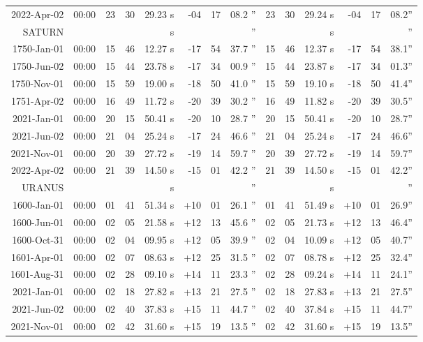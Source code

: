 \begin{longtable}{r@{\,}r|r@{h\,}r@{m\,}r<{s}|r@{°\,}r@{'\,}r<{''}||r@{h\,}r@{m\,}r<{s}|r@{°\,}r@{'\,}r<{''}}
 2022-Apr-02 & 00:00  &   23 & 30 & 29.23 & -04 & 17 & 08.2 & 23&30&29.24 & -04&17&08.2\\ %
SATURN           \\
 1750-Jan-01 & 00:00  &   15 & 46 & 12.27 & -17 & 54 & 37.7 & 15&46&12.37 & -17&54&38.1\\ %
 1750-Jun-02 & 00:00  &   15 & 44 & 23.78 & -17 & 34 & 00.9 & 15&44&23.87 & -17&34&01.3\\ %
 1750-Nov-01 & 00:00  &   15 & 59 & 19.00 & -18 & 50 & 41.0 & 15&59&19.10 & -18&50&41.4\\ %
 1751-Apr-02 & 00:00  &   16 & 49 & 11.72 & -20 & 39 & 30.2 & 16&49&11.82 & -20&39&30.5\\ %
 2021-Jan-01 & 00:00  &   20 & 15 & 50.41 & -20 & 10 & 28.7 & 20&15&50.41 & -20&10&28.7\\ %
 2021-Jun-02 & 00:00  &   21 & 04 & 25.24 & -17 & 24 & 46.6 & 21&04&25.24 & -17&24&46.6\\ %
 2021-Nov-01 & 00:00  &   20 & 39 & 27.72 & -19 & 14 & 59.7 & 20&39&27.72 & -19&14&59.7\\ %
 2022-Apr-02 & 00:00  &   21 & 39 & 14.50 & -15 & 01 & 42.2 & 21&39&14.50 & -15&01&42.2\\ %
URANUS      \\
 1600-Jan-01 & 00:00  &   01 & 41 & 51.34 & +10 & 01 & 26.1 & 01&41&51.49 & +10&01&26.9\\ %
 1600-Jun-01 & 00:00  &   02 & 05 & 21.58 & +12 & 13 & 45.6 & 02&05&21.73 & +12&13&46.4\\ %
 1600-Oct-31 & 00:00  &   02 & 04 & 09.95 & +12 & 05 & 39.9 & 02&04&10.09 & +12&05&40.7\\ %
 1601-Apr-01 & 00:00  &   02 & 07 & 08.63 & +12 & 25 & 31.5 & 02&07&08.78 & +12&25&32.4\\ %
 1601-Aug-31 & 00:00  &   02 & 28 & 09.10 & +14 & 11 & 23.3 & 02&28&09.24 & +14&11&24.1\\ %
 2021-Jan-01 & 00:00  &   02 & 18 & 27.82 & +13 & 21 & 27.5 & 02&18&27.83 & +13&21&27.5\\ %
 2021-Jun-02 & 00:00  &   02 & 40 & 37.83 & +15 & 11 & 44.7 & 02&40&37.84 & +15&11&44.7\\ %
 2021-Nov-01 & 00:00  &   02 & 42 & 31.60 & +15 & 19 & 13.5 & 02&42&31.60 & +15&19&13.5\\ %

\end{longtable}
